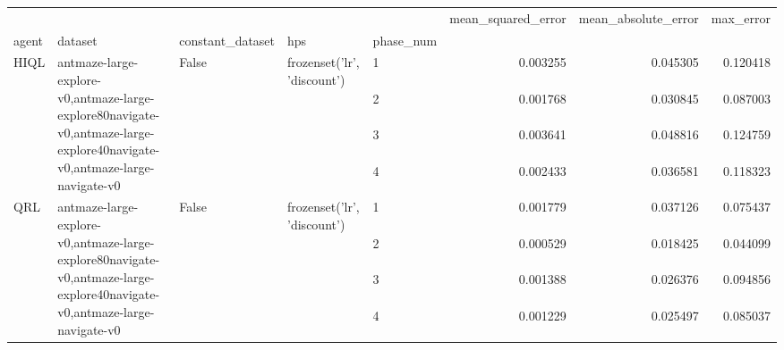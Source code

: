\begin{tabular}{lllllrrr}
\toprule
 &  &  &  &  & mean_squared_error & mean_absolute_error & max_error \\
agent & dataset & constant_dataset & hps & phase_num &  &  &  \\
\midrule
\multirow[t]{4}{*}{HIQL} & \multirow[t]{4}{*}{antmaze-large-explore-v0,antmaze-large-explore80navigate-v0,antmaze-large-explore40navigate-v0,antmaze-large-navigate-v0} & \multirow[t]{4}{*}{False} & \multirow[t]{4}{*}{frozenset({'lr', 'discount'})} & 1 & 0.003255 & 0.045305 & 0.120418 \\
 &  &  &  & 2 & 0.001768 & 0.030845 & 0.087003 \\
 &  &  &  & 3 & 0.003641 & 0.048816 & 0.124759 \\
 &  &  &  & 4 & 0.002433 & 0.036581 & 0.118323 \\
\cline{1-8} \cline{2-8} \cline{3-8} \cline{4-8}
\multirow[t]{4}{*}{QRL} & \multirow[t]{4}{*}{antmaze-large-explore-v0,antmaze-large-explore80navigate-v0,antmaze-large-explore40navigate-v0,antmaze-large-navigate-v0} & \multirow[t]{4}{*}{False} & \multirow[t]{4}{*}{frozenset({'lr', 'discount'})} & 1 & 0.001779 & 0.037126 & 0.075437 \\
 &  &  &  & 2 & 0.000529 & 0.018425 & 0.044099 \\
 &  &  &  & 3 & 0.001388 & 0.026376 & 0.094856 \\
 &  &  &  & 4 & 0.001229 & 0.025497 & 0.085037 \\
\cline{1-8} \cline{2-8} \cline{3-8} \cline{4-8}
\bottomrule
\end{tabular}
